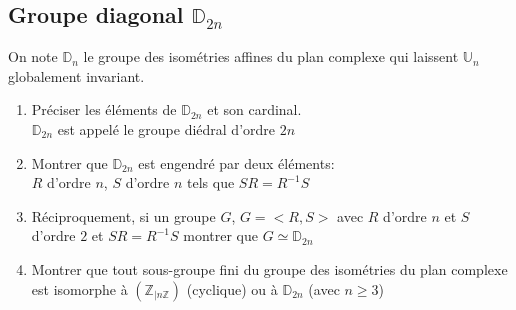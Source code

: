 \documentclass[10pt,a4paper]{article}
\theoremstyle{definition}
\begin{document}
\subsection{Groupe diagonal $\mathbb{D}_{2n}$}
\noindent On note $\mathbb{D}_n$ le groupe des isométries affines du plan complexe qui laissent $\mathbb{U}_n$ globalement invariant.
\begin{enumerate}
\item Préciser les éléments de $\mathbb{D}_{2n}$ et son cardinal. \\
$\mathbb{D}_{2n}$ est appelé le groupe diédral d'ordre $2n$
\item Montrer que $\mathbb{D}_{2n}$ est engendré par deux éléments: \\
$R$ d'ordre $n$, $S$ d'ordre $n$ tels que $SR = R^{-1}S$
\item Réciproquement, si un groupe $G$, $G = <R, S>$ avec $R$ d'ordre $n$ et $S$ d'ordre $2$ et $SR = R^{-1}S$ montrer que $G \simeq \mathbb{D}_{2n}$
\item Montrer que tout sous-groupe fini du groupe des isométries du plan complexe est isomorphe à $(\mathbb{Z}_{|n\mathbb{Z}})$ (cyclique) ou à $\mathbb{D}_{2n}$ (avec $n \geq 3$)
\end{enumerate}
\end{document}
